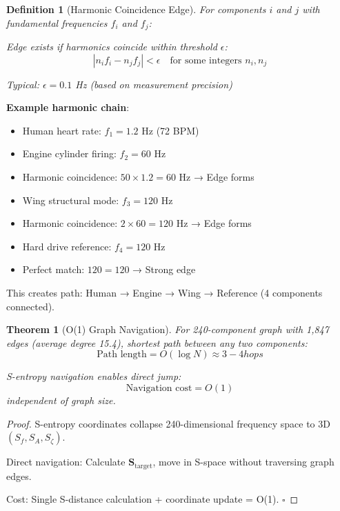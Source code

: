 \documentclass[12pt,a4paper]{article}
\newtheorem{theorem}{Theorem}
\newtheorem{definition}{Definition}
\begin{document}
\begin{definition}[Harmonic Coincidence Edge]
For components $i$ and $j$ with fundamental frequencies $f_i$ and $f_j$:

Edge exists if harmonics coincide within threshold $\epsilon$:
\begin{equation}
|n_i f_i - n_j f_j| < \epsilon \quad \text{for some integers } n_i, n_j
\end{equation}

Typical: $\epsilon = 0.1$ Hz (based on measurement precision)
\end{definition}

\textbf{Example harmonic chain}:
\begin{itemize}
\item Human heart rate: $f_1 = 1.2$ Hz (72 BPM)
\item Engine cylinder firing: $f_2 = 60$ Hz
\item Harmonic coincidence: $50 \times 1.2 = 60$ Hz → Edge forms
\item Wing structural mode: $f_3 = 120$ Hz
\item Harmonic coincidence: $2 \times 60 = 120$ Hz → Edge forms
\item Hard drive reference: $f_4 = 120$ Hz
\item Perfect match: $120 = 120$ → Strong edge
\end{itemize}

This creates path: Human → Engine → Wing → Reference (4 components connected).

\begin{theorem}[O(1) Graph Navigation]
For 240-component graph with 1,847 edges (average degree 15.4), shortest path between any two components:
\begin{equation}
\text{Path length} = O(\log N) \approx 3-4 hops
\end{equation}

S-entropy navigation enables direct jump:
\begin{equation}
\text{Navigation cost} = O(1)
\end{equation}
independent of graph size.
\end{theorem}

\begin{proof}
S-entropy coordinates collapse 240-dimensional frequency space to 3D $(S_f, S_A, S_{\zeta})$.

Direct navigation: Calculate $\mathbf{S}_{\text{target}}$, move in S-space without traversing graph edges.

Cost: Single S-distance calculation + coordinate update = O(1). $\square$
\end{proof}
\end{document}
